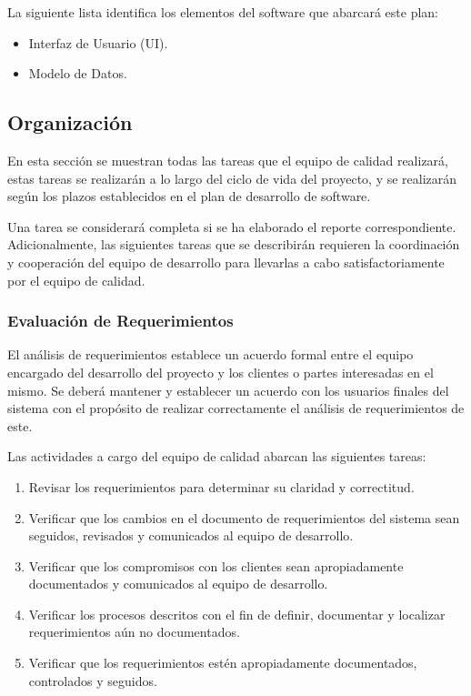 \documentclass[a4paper,10pt]{article}
\begin{document}
	La siguiente lista identifica los elementos del software que abarcará este plan:
	\begin{itemize}
		\item Interfaz de Usuario (UI).
		\item Modelo de Datos.
	\end{itemize}
	
	\subsection{Organización}
	En esta sección se muestran todas las tareas que el equipo de calidad realizará, estas tareas se realizarán a lo largo del ciclo de vida del proyecto, y se realizarán según los plazos establecidos en el plan de desarrollo de software.
	
	Una tarea se considerará completa si se ha elaborado el reporte correspondiente. Adicionalmente, las siguientes tareas que se describirán requieren la coordinación y cooperación del equipo de desarrollo para llevarlas a cabo satisfactoriamente por el equipo de calidad.
	
	\subsubsection{Evaluación de Requerimientos}
	El análisis de requerimientos establece un acuerdo formal entre el equipo encargado del desarrollo del proyecto y los clientes o partes interesadas en el mismo. Se deberá mantener y establecer un acuerdo con los usuarios finales del sistema con el propósito de realizar correctamente el análisis de requerimientos de este.
	
	Las actividades a cargo del equipo de calidad abarcan las siguientes tareas:
	\begin{enumerate}
		\item Revisar los requerimientos para determinar su claridad y correctitud.
		\item Verificar que los cambios en el documento de requerimientos del sistema sean seguidos, revisados y comunicados al equipo de desarrollo.
		\item Verificar que los compromisos con los clientes sean apropiadamente documentados y comunicados al equipo de desarrollo.
		\item Verificar los procesos descritos con el fin de definir, documentar y localizar requerimientos aún no documentados.
		\item Verificar que los requerimientos estén apropiadamente documentados, controlados y seguidos.
	\end{enumerate}
	
\end{document}
